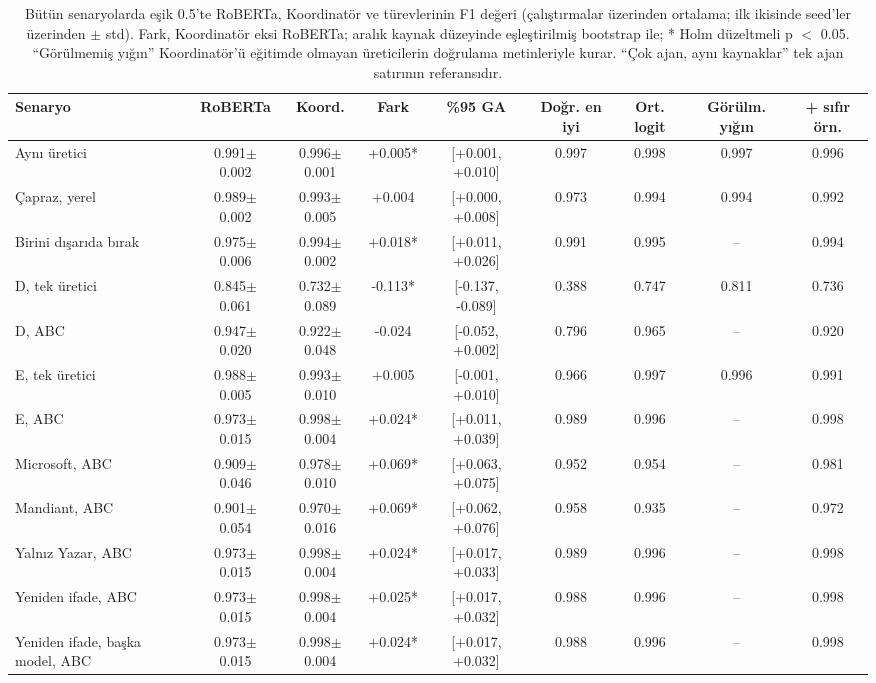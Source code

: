 \begin{table}[t]
\centering
\footnotesize\setlength{\tabcolsep}{3pt}
\caption{Bütün senaryolarda eşik 0.5'te RoBERTa, Koordinatör ve türevlerinin F1 değeri (çalıştırmalar üzerinden ortalama; ilk ikisinde seed'ler üzerinden $\pm$ std). Fark, Koordinatör eksi RoBERTa; aralık kaynak düzeyinde eşleştirilmiş bootstrap ile; * Holm düzeltmeli p $<$ 0.05. ``Görülmemiş yığın'' Koordinatör'ü eğitimde olmayan üreticilerin doğrulama metinleriyle kurar. ``Çok ajan, aynı kaynaklar'' tek ajan satırının referansıdır.}
\label{tab:coordinator}
\begin{tabular}{@{}lcccccccc@{}}
\toprule
Senaryo & RoBERTa & Koord. & Fark & \%95 GA & Doğr. en iyi & Ort. logit & Görülm. yığın & + sıfır örn. \\
\midrule
Aynı üretici & 0.991$\pm$0.002 & 0.996$\pm$0.001 & +0.005* & [+0.001, +0.010] & 0.997 & 0.998 & 0.997 & 0.996 \\
Çapraz, yerel & 0.989$\pm$0.002 & 0.993$\pm$0.005 & +0.004 & [+0.000, +0.008] & 0.973 & 0.994 & 0.994 & 0.992 \\
Birini dışarıda bırak & 0.975$\pm$0.006 & 0.994$\pm$0.002 & +0.018* & [+0.011, +0.026] & 0.991 & 0.995 & -- & 0.994 \\
D, tek üretici & 0.845$\pm$0.061 & 0.732$\pm$0.089 & -0.113* & [-0.137, -0.089] & 0.388 & 0.747 & 0.811 & 0.736 \\
D, ABC & 0.947$\pm$0.020 & 0.922$\pm$0.048 & -0.024 & [-0.052, +0.002] & 0.796 & 0.965 & -- & 0.920 \\
E, tek üretici & 0.988$\pm$0.005 & 0.993$\pm$0.010 & +0.005 & [-0.001, +0.010] & 0.966 & 0.997 & 0.996 & 0.991 \\
E, ABC & 0.973$\pm$0.015 & 0.998$\pm$0.004 & +0.024* & [+0.011, +0.039] & 0.989 & 0.996 & -- & 0.998 \\
Microsoft, ABC & 0.909$\pm$0.046 & 0.978$\pm$0.010 & +0.069* & [+0.063, +0.075] & 0.952 & 0.954 & -- & 0.981 \\
Mandiant, ABC & 0.901$\pm$0.054 & 0.970$\pm$0.016 & +0.069* & [+0.062, +0.076] & 0.958 & 0.935 & -- & 0.972 \\
Yalnız Yazar, ABC & 0.973$\pm$0.015 & 0.998$\pm$0.004 & +0.024* & [+0.017, +0.033] & 0.989 & 0.996 & -- & 0.998 \\
Yeniden ifade, ABC & 0.973$\pm$0.015 & 0.998$\pm$0.004 & +0.025* & [+0.017, +0.032] & 0.988 & 0.996 & -- & 0.998 \\
Yeniden ifade, başka model, ABC & 0.973$\pm$0.015 & 0.998$\pm$0.004 & +0.024* & [+0.017, +0.032] & 0.988 & 0.996 & -- & 0.998 \\

\end{tabular}
\end{table}
